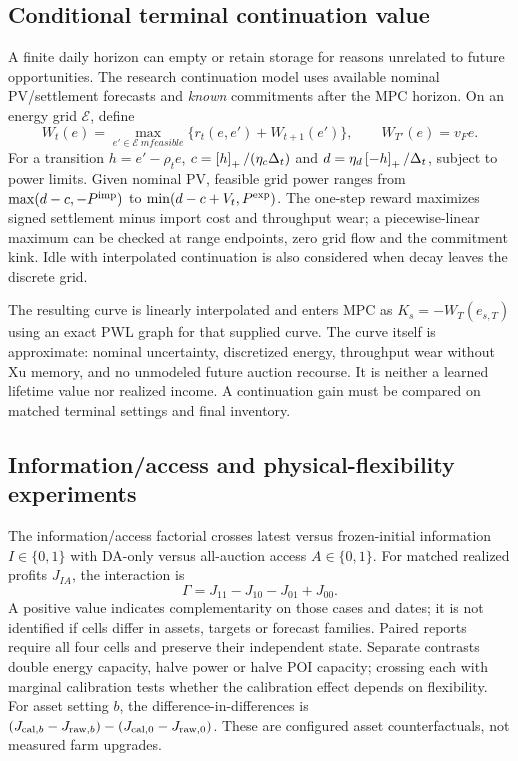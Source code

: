 \subsection{Conditional terminal continuation value}
A finite daily horizon can empty or retain storage for reasons unrelated to
future opportunities. The research continuation model uses available nominal
PV/settlement forecasts and \emph{known} commitments after the MPC horizon.
On an energy grid $\mathcal E$, define
\begin{equation}
 W_t(e)=\max_{e'\in\mathcal E\ {
m feasible}}
       \{r_t(e,e')+W_{t+1}(e')\},\qquad W_{T'}(e)=v_F e.
\end{equation}
For a transition $h=e'-\rho_te$,
$c=\left[h\right]_+/(\eta_c\Delta_t)$ and
$d=\eta_d\left[-h\right]_+/\Delta_t$, subject to power limits.
Given nominal PV, feasible grid power ranges from
$\max(d-c,-P^{\rm imp})$ to $\min(d-c+V_t,P^{\rm exp})$.
The one-step reward maximizes signed settlement minus import cost and
throughput wear; a piecewise-linear maximum can be checked at range endpoints,
zero grid flow and the commitment kink. Idle with interpolated continuation
is also considered when decay leaves the discrete grid.

The resulting curve is linearly interpolated and enters MPC as
$K_s=-W_T(e_{s,T})$ using an exact PWL graph for that supplied curve.
The curve itself is approximate: nominal uncertainty, discretized energy,
throughput wear without Xu memory, and no unmodeled future auction recourse.
It is neither a learned lifetime value nor realized income. A continuation
gain must be compared on matched terminal settings and final inventory.

\subsection{Information/access and physical-flexibility experiments}
The information/access factorial crosses latest versus frozen-initial
information $I\in\{0,1\}$ with DA-only versus all-auction access
$A\in\{0,1\}$. For matched realized profits $J_{IA}$, the interaction is
\begin{equation}
 \Gamma=J_{11}-J_{10}-J_{01}+J_{00}.
\end{equation}
A positive value indicates complementarity on those cases and dates; it is
not identified if cells differ in assets, targets or forecast families.
Paired reports require all four cells and preserve their independent state.
Separate contrasts double energy capacity, halve power or halve POI capacity;
crossing each with marginal calibration tests whether the calibration effect
depends on flexibility. For asset setting $b$, the difference-in-differences is
$(J_{{\rm cal},b}-J_{{\rm raw},b})-(J_{{\rm cal},0}-J_{{\rm raw},0})$.
These are configured asset counterfactuals, not measured farm upgrades.

